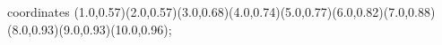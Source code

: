 					coordinates { (1.0,0.57)(2.0,0.57)(3.0,0.68)(4.0,0.74)(5.0,0.77)(6.0,0.82)(7.0,0.88)(8.0,0.93)(9.0,0.93)(10.0,0.96)};